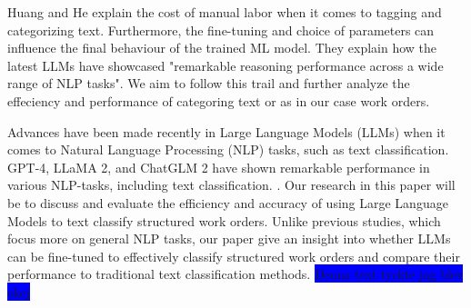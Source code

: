 \documentclass{article}
\begin{document}





Huang and He \cite{huang2024} explain the cost of manual labor when it comes to tagging and categorizing text.
Furthermore, the fine-tuning and choice of parameters can influence the final behaviour of the trained
ML model.
They explain how the latest LLMs have showcased "remarkable reasoning performance across a wide range of
NLP tasks".
We aim to follow this trail and further analyze the effeciency and performance of categoring text or as in our
case work orders.
\bigskip

Advances have been made recently in Large Language Models (LLMs) when it comes to Natural Language Processing (NLP) tasks,
such as text classification.
GPT-4, LLaMA 2, and ChatGLM 2 have shown remarkable performance in various NLP-tasks, including text classification.
\cite{zhang2024}.
Our research in this paper will be to discuss and evaluate the efficiency and accuracy of using Large Language Models
to text classify structured work orders. Unlike previous studies, which focus more on general NLP tasks,
our paper give an insight into whether LLMs can be fine-tuned to effectively classify structured work orders and compare their
performance to traditional text classification methods.
\colorbox{blue}{Denna text tyckte jag blev okej}



\end{document}
